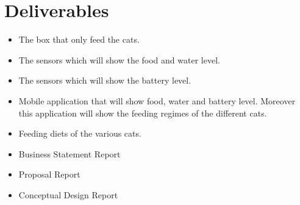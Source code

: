 \section{Deliverables} \label{sec:deliverables}
\begin{itemize}
\item The box that only feed the cats.

\item The sensors which will show the food and water level. 

\item The sensors which will show the battery level. 

\item Mobile application that will show food, water and battery level. Moreover this application will show the feeding regimes of the different cats. 

\item Feeding diets of the various cats.

\item Business Statement Report 

\item Proposal Report

\item Conceptual Design Report
\end{itemize}